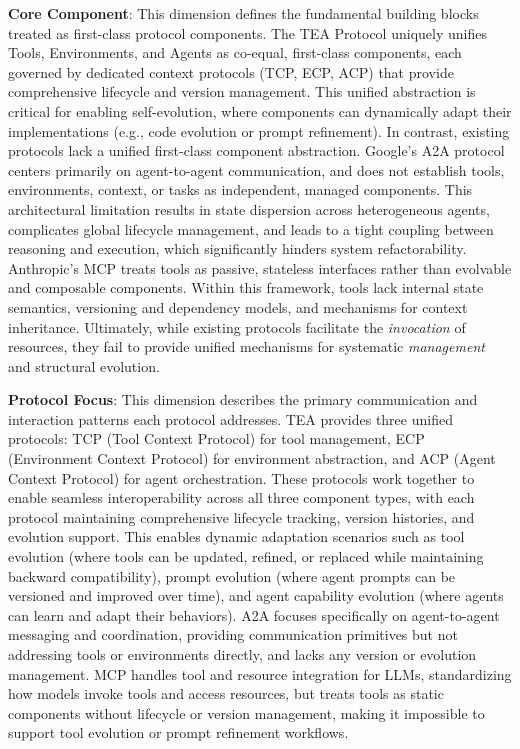 \documentclass[11pt]{article}
\begin{document}
\textbf{Core Component}: This dimension defines the fundamental building blocks treated as first-class protocol components. The TEA Protocol uniquely unifies Tools, Environments, and Agents as co-equal, first-class components, each governed by dedicated context protocols (TCP, ECP, ACP) that provide comprehensive lifecycle and version management. This unified abstraction is critical for enabling self-evolution, where components can dynamically adapt their implementations (e.g., code evolution or prompt refinement). In contrast, existing protocols lack a unified first-class component abstraction. Google's A2A protocol centers primarily on agent-to-agent communication, and does not establish tools, environments, context, or tasks as independent, managed components. This architectural limitation results in state dispersion across heterogeneous agents, complicates global lifecycle management, and leads to a tight coupling between reasoning and execution, which significantly hinders system refactorability. Anthropic's MCP treats tools as passive, stateless interfaces rather than evolvable and composable components. Within this framework, tools lack internal state semantics, versioning and dependency models, and mechanisms for context inheritance. Ultimately, while existing protocols facilitate the \textit{invocation} of resources, they fail to provide unified mechanisms for systematic \textit{management} and structural evolution.

\textbf{Protocol Focus}: This dimension describes the primary communication and interaction patterns each protocol addresses. TEA provides three unified protocols: TCP (Tool Context Protocol) for tool management, ECP (Environment Context Protocol) for environment abstraction, and ACP (Agent Context Protocol) for agent orchestration. These protocols work together to enable seamless interoperability across all three component types, with each protocol maintaining comprehensive lifecycle tracking, version histories, and evolution support. This enables dynamic adaptation scenarios such as tool evolution (where tools can be updated, refined, or replaced while maintaining backward compatibility), prompt evolution (where agent prompts can be versioned and improved over time), and agent capability evolution (where agents can learn and adapt their behaviors). A2A focuses specifically on agent-to-agent messaging and coordination, providing communication primitives but not addressing tools or environments directly, and lacks any version or evolution management. MCP handles tool and resource integration for LLMs, standardizing how models invoke tools and access resources, but treats tools as static components without lifecycle or version management, making it impossible to support tool evolution or prompt refinement workflows.
\end{document}
